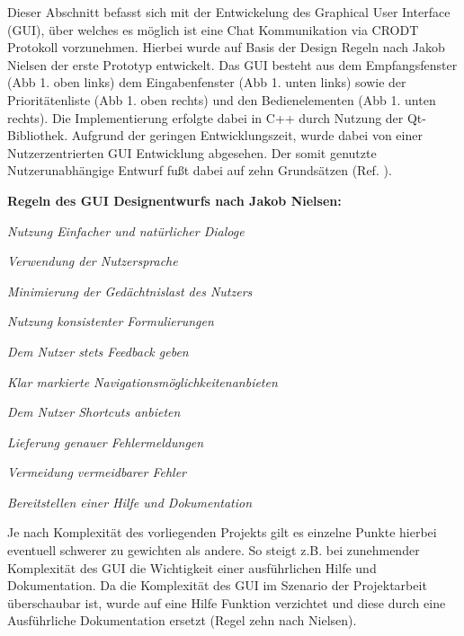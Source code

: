 \label{cap:chatGui}

Dieser Abschnitt befasst sich mit der Entwickelung des Graphical User Interface
(GUI), {\"u}ber welches es m{\"o}glich ist eine Chat Kommunikation via CRODT
Protokoll vorzunehmen. Hierbei wurde auf Basis der Design Regeln nach
Jakob Nielsen der erste Prototyp entwickelt. Das GUI besteht
aus dem Empfangsfenster (Abb 1. oben links) dem Eingabenfenster (Abb 1.
unten links) sowie der Priorit{\"a}tenliste (Abb 1. oben rechts) und den
Bedienelementen (Abb 1. unten rechts). Die Implementierung erfolgte dabei in
C++ durch Nutzung der Qt-Bibliothek. Aufgrund der geringen Entwicklungszeit,
wurde dabei von einer Nutzerzentrierten GUI Entwicklung
abgesehen. Der somit genutzte Nutzerunabh{\"a}ngige Entwurf fu{\ss}t dabei auf
zehn Grunds{\"a}tzen (Ref. \cite{Nielsen}).

\textbf{Regeln des GUI Designentwurfs nach Jakob Nielsen:}

   \begin{compactenum}[I]
     \item \textit{Nutzung Einfacher und nat{\"u}rlicher Dialoge}
     \item \textit{Verwendung der Nutzersprache}
     \item \textit{Minimierung der Ged{\"a}chtnislast des Nutzers}
     \item \textit{Nutzung konsistenter Formulierungen}
     \item \textit{Dem Nutzer stets Feedback geben}
     \item \textit{Klar markierte Navigationsm{\"o}glichkeitenanbieten}
     \item \textit{Dem Nutzer Shortcuts anbieten}
     \item \textit{Lieferung genauer Fehlermeldungen}
     \item \textit{Vermeidung vermeidbarer Fehler}
     \item \textit{Bereitstellen einer Hilfe und Dokumentation}
   \end{compactenum}
   \label{Nielsen}
   

Je nach Komplexit{\"a}t des vorliegenden Projekts gilt es einzelne Punkte
hierbei eventuell schwerer zu gewichten als andere. So steigt z.B. bei
zunehmender Komplexit{\"a}t des GUI die Wichtigkeit einer ausf{\"u}hrlichen
Hilfe und Dokumentation. Da die Komplexit{\"a}t des GUI im Szenario der
Projektarbeit {\"u}berschaubar ist, wurde auf eine Hilfe Funktion verzichtet und
diese durch eine Ausf{\"u}hrliche Dokumentation ersetzt (Regel zehn nach
Nielsen).

